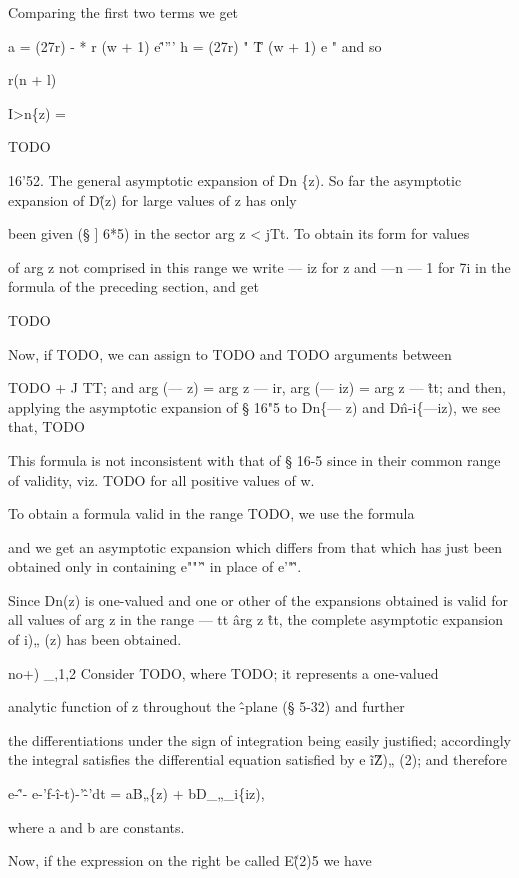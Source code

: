 Comparing the first two terms we get

a = (27r) - * r (w + 1) e\^'''' h = (27r) " \^ T (w + 1) e " and so

r(n + l)

I>n\{z) =

TODO

16'52. The general asymptotic expansion of Dn \{z). So far the
asymptotic expansion of D\^ (z) for large values of z has only

been given (§ ] 6*5) in the sector arg z < jTt. To obtain its form for
values

of arg z not comprised in this range we write — iz for z and —n — 1
for 7i in the formula of the preceding section, and get

TODO

Now, if TODO, we can assign to TODO and TODO arguments between

TODO + J TT; and arg (— z) = arg z — ir, arg (— iz) = arg z — \^tt;
and then, applying the asymptotic expansion of § 16"5 to Dn\{— z) and
D\^n-i\{—iz), we see that, TODO

%
%

This formula is not inconsistent with that of § 16-5 since in their
common range of validity, viz. TODO for all positive values of w.

To obtain a formula valid in the range TODO, we use the formula

and we get an asymptotic expansion which differs from that which has
just been obtained only in containing e""'\^' in place of e'"\^'.

Since Dn(z) is one-valued and one or other of the expansions obtained
is valid for all values of arg z in the range — tt \^ arg z \^tt, the
complete asymptotic expansion of i)„ (z) has been obtained.


no+) \_,1,2 Consider TODO, where TODO; it represents a one-valued

analytic function of z throughout the \^-plane (§ 5-32) and further

the differentiations under the sign of integration being easily
justified; accordingly the integral satisfies the differential
equation satisfied by e \~ i\^ Z)„ (2); and therefore

e-\^'- e-'f-\^i-t)-'\^-'dt = aB„\{z) + bD\_„\_i\{iz),

where a and b are constants.

Now, if the expression on the right be called E\^ (2)5 we have

